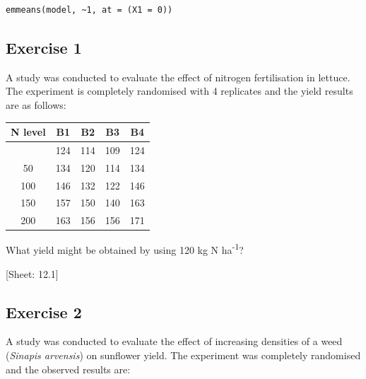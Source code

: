 \documentclass[a4paper,12pt,oneside]{book}
\begin{document}
\begin{verbatim}
emmeans(model, ~1, at = (X1 = 0))
\end{verbatim}

\hypertarget{exercise-1-8}{%
\subsection{Exercise 1}\label{exercise-1-8}}

A study was conducted to evaluate the effect of nitrogen fertilisation in lettuce. The experiment is completely randomised with 4 replicates and the yield results are as follows:

\begin{longtable}[]{@{}ccccc@{}}
\toprule\noalign{}
N level & B1 & B2 & B3 & B4 \\
\midrule\noalign{}
\endhead
\bottomrule\noalign{}
\endlastfoot
0 & 124 & 114 & 109 & 124 \\
50 & 134 & 120 & 114 & 134 \\
100 & 146 & 132 & 122 & 146 \\
150 & 157 & 150 & 140 & 163 \\
200 & 163 & 156 & 156 & 171 \\
\end{longtable}

What yield might be obtained by using 120 kg N ha\textsuperscript{-1}?

{[}Sheet: 12.1{]}

\hypertarget{exercise-2-8}{%
\subsection{Exercise 2}\label{exercise-2-8}}

A study was conducted to evaluate the effect of increasing densities of a weed (\emph{Sinapis arvensis}) on sunflower yield. The experiment was completely randomised and the observed results are:
\end{document}
